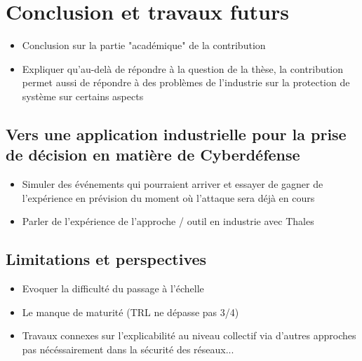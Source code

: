 \chapter{Conclusion et travaux futurs}\label{ch:conclusion} %

\begin{itemize}
    \item Conclusion sur la partie "académique" de la contribution
    \item Expliquer qu'au-delà de répondre à la question de la thèse, la contribution permet aussi de répondre à des problèmes de l'industrie sur la protection de système sur certains aspects
\end{itemize}

\section{Vers une application industrielle pour la prise de décision en matière de Cyberdéfense}
\begin{itemize}
    \item Simuler des événements qui pourraient arriver et essayer de gagner de l'expérience en prévision du moment où l'attaque sera déjà en cours
    \item Parler de l'expérience de l'approche / outil en industrie avec Thales
\end{itemize}

\section{Limitations et perspectives}
\begin{itemize}
    \item Evoquer la difficulté du passage à l'échelle
    \item Le manque de maturité (TRL ne dépasse pas 3/4)
    \item Travaux connexes sur l'explicabilité au niveau collectif via d'autres approches pas nécéssairement dans la sécurité des réseaux...
\end{itemize}
